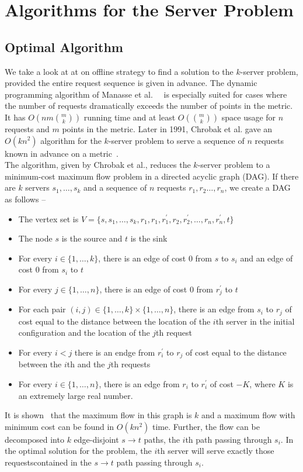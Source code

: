 \chapter{Algorithms for the Server Problem}\label{ch:algorithms}

\section{Optimal Algorithm}\label{sec:optimal-algorithm}

We take a look at at on offline strategy to find a solution to the $k$-server problem, provided the entire request sequence is given in advance. The dynamic programming algorithm of Manasse et al.\ ~\cite{MMS88} is especially suited for cases where the number of requests dramatically exceeds the number of points in the metric. It has $O(nm\binom{m}{k})$ running time and at least $O(\binom{m}{k})$ space usage for $n$ requests and $m$ points in the metric. Later in 1991, Chrobak et al. gave an $O(kn^2)$ algorithm for the $k$-server problem to serve a sequence of $n$ requests known in advance on a metric~\cite{CKPV91}. \\

The algorithm, given by Chrobak et al., reduces the $k$-server problem to a minimum-cost maximum flow problem in a directed acyclic graph (DAG). If there are $k$ servers $s_1,\hdots,s_k$ and a sequence of $n$ requests $r_1,r_2\hdots,r_n$, we create a DAG as follows --
\begin{itemize}
\item
The vertex set is
$V = \{s,s_1,\hdots,s_k,r_1,r_1,r^\prime_1,r_2,r^\prime_2,\hdots,r_n,r^\prime_n,t\}$
\item
The node $s$ is the source and $t$ is the sink
\item
 For every $i\in \{1,\hdots,k\}$, there is an edge of cost $0$ from $s$ to $s_i$ and an edge of cost $0$ from $s_i$ to $t$
\item
For every $j\in \{1,\hdots,n\}$, there is an edge of cost $0$ from $r^\prime_j$ to $t$
\item
For each pair $(i,j) \in \{1,\hdots,k\} \times \{1,\hdots,n\}$, there is an edge from $s_i$ to $r_j$ of cost equal to the distance between the location of the $i$th server in the initial configuration and the location of the $j$th request
\item
For every $i < j$ there is an endge from $r^\prime_i$ to $r_j$ of cost equal to the distance between the $i$th and the $j$th requests
\item
For every $i\in \{1,\hdots,n\}$, there is an edge from $r_i$ to $r^\prime_i$ of cost $-K$, where $K$ is an extremely large real number.
\end{itemize}
It is shown~\cite{CKPV91} that the maximum flow in this graph is $k$ and a maximum flow with minimum cost can be found in $O(kn^2)$ time. Further, the flow can be decomposed into $k$ edge-disjoint $s\rightarrow t$ paths, the $i$th path passing through $s_i$. In the optimal solution for the problem, the $i$th server will serve exactly those requestscontained in the $s\rightarrow t$ path passing through $s_i$.

